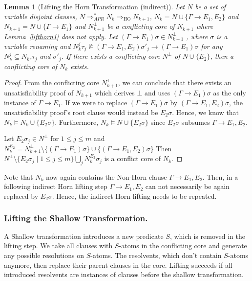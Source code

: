 \documentclass{llncs}
\newcommand{\imp}{\rightarrow}
\newcommand{\apr}{ \Rightarrow_{APR}}
\newtheorem{lem}[theorem]{Lemma}
\begin{document}
\begin{lem}[Lifting the Horn Transformation (indirect)]\label{lifthorn2}
Let $N$ be a set of variable disjoint clauses, 
$N\apr^* N_k \Rightarrow_{\text{HO}} N_{k+1}$,
$N_k = N\cup\{\Gamma \imp E_1,E_2\}$ and $N_{k+1} = N\cup\{\Gamma \imp E_1\}$ and
$N^\bot_{k+1}$ be a conflicting core of $N_{k+1}$ where Lemma~\ref{lifthorn1} does not apply.
Let $(\Gamma \imp E_1)\sigma \in N^\bot_{k+1}$ , where $\sigma$ is a variable renaming and
$N_k^j\tau_j\not \models  (\Gamma \imp E_1,E_2)\sigma'_j\rightarrow (\Gamma \imp E_1)\sigma$ for any $N_k^j\subseteq N_k$,$\tau_j$ and $\sigma'_j$. 
If there exists a conflicting core $N^\bot$ of $N\cup\{E_2\}$, then a  conflicting core of $N_k$ exists.
\end{lem}

\begin{proof}
From the conflicting core $N^\bot_{k+1}$, we can conclude that there exists an unsatisfiability proof of $N_{k+1}$ which derives $\bot$ and uses  $(\Gamma \imp E_1)\sigma$ as the only instance of $\Gamma \imp E_1$. If we were to replace $(\Gamma \imp E_1)\sigma$ by  $(\Gamma \imp E_1,E_2)\sigma$, the unsatisfiability proof's root clause would instead be $E_2\sigma$.
Hence, we know that $N_k\models N_k \cup \{E_2\sigma\}$. 
Furthermore, $N_k\models  N \cup \{E_2\sigma\}$ since $E_2\sigma$ subsumes $\Gamma \imp E_1,E_2$.

Let $E_2\sigma_j \in N^\bot$ for $1 \leq j \leq m$ and $N^{E_2}_k= N^\bot_{k+1} \setminus \{(\Gamma \imp E_1)\sigma\} \cup \{(\Gamma \imp E_1,E_2)\sigma\}$
Then  $N^\bot \setminus \{E_2\sigma_j \mid 1 \leq j \leq m\} \bigcup\limits_j N^{E_2}_{k}\sigma_j$ is a conflict core of  $N_k$.
\end{proof}

Note that $N_{k}$ now again contains the Non-Horn clause $\Gamma \imp E_1,E_2$. 
Then, in a following indirect Horn lifting step $\Gamma \imp E_1,E_2$ can not necessarily be again replaced by  $E_2\sigma$.
Hence, the indirect Horn lifting needs to be repeated.

\subsubsection{Lifting the Shallow Transformation.}
A Shallow transformation introduces a new predicate $S$, which is removed in the lifting step.
We take all clauses with $S$-atoms in the conflicting core and generate any 
possible resolutions on $S$-atoms. 
The resolvents, which don't contain $S$-atoms anymore, then replace their parent clauses in the core.
Lifting succeeds if all introduced resolvents are instances of clauses before the shallow
transformation.
\end{document}
